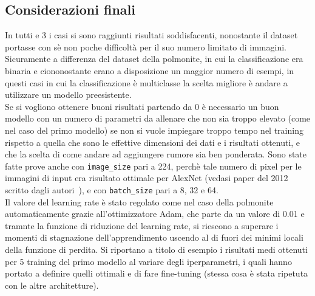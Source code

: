     \subsection{Considerazioni finali}
    In tutti e 3 i casi si sono raggiunti risultati soddisfacenti, nonostante il dataset portasse con sè non poche difficoltà 
    per il suo numero limitato di immagini. Sicuramente
    a differenza del dataset della polmonite, in cui la classificazione era binaria e ciononostante erano a disposizione un maggior numero di esempi, 
    in questi casi in cui la classificazione è multiclasse la scelta migliore è andare a utilizzare un modello preesistente. \\
    Se si vogliono ottenere buoni risultati partendo da 0 è necessario un buon modello con un numero di parametri da allenare che 
    non sia troppo elevato (come nel caso del primo modello) se non si vuole impiegare troppo tempo nel training rispetto a quella che sono le effettive dimensioni dei dati e i risultati ottenuti, e che la scelta di come andare ad aggiungere rumore sia ben ponderata.
    Sono state fatte prove anche con \lstinline{image_size} pari a 224, perchè tale numero di pixel per le immagini di input era 
    risultato ottimale per AlexNet (vedasi paper del 2012 scritto dagli autori~\cite{alexnet}), e con \lstinline{batch_size} pari a 8, 32 e 64. \\
    Il valore del learning rate è stato regolato come nel caso della polmonite automaticamente grazie all'ottimizzatore Adam, 
    che parte da un valore di 0.01 e tramnte la funzione di riduzione del learning rate, si riescono a superare i momenti di 
    stagnazione dell'apprendimento uscendo al di fuori dei minimi locali della funzione di perdita. 
    Si riportano a titolo di esempio i risultati medi ottenuti per 5 training del primo modello al variare
     degli iperparametri, i quali hanno portato a definire quelli ottimali e di fare fine-tuning (stessa cosa è stata ripetuta con le altre architetture).
